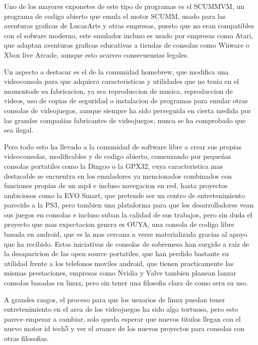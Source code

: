 \begin{multicols}{2}
Uno de los mayores exponetes de este tipo de programas es el SCUMMVM, un programa de codigo abierto que emula el motor SCUMM, usado para las aventuras graficas de LucasArts y otras empresas, puesto que no eran compatibles con el sofware moderno, este emulador incluso es usado por empresas como Atari, que adaptan aventuras graficas educativas a tiendas de consolas como Wiiware o Xbox live Arcade, aunque esto acarreo consecuensias legales.

Un aspecto a destacar es el de la comunidad homebrew, que modifica una videoconsola para que adquiera caracteristicas y utilidades que no tenia en el momentode su fabricacion, ya sea reproduccion de musica, reproduccion de videos, uso de copias de seguridad o instalacion de programas para emular otras consolas de videojuegos, aunque siempre ha sido perseguida en cierta medida por las grandes compańias fabricantes de videojuegos, nunca se ha comprobado que sea ilegal.

Pero todo esto ha llevado a la comunidad de software libre a crear sus propias videoconsolas, modificables y de codigo abierto, comenzando por pequeńas consolas portatiles como la Dingoo o la GPX32, cuya caracteristica mas destacable  se encuentra en los emuladores ya mencionados combinados con funciones propias de un mp4 e incluso navegacion en red, hasta proyectos ambiciosos como la EVO Smart, que pretende ser un centro de entretenimiento parecido a la PS3, pero tambien una plataforma para que los desarrolladores vean sus juegos en consolas e incluso suban la calidad de sus trabajos, pero sin duda el proyecto que mas expectacion genera es OUYA, una consola de codigo libre basada en android, que es la mas cercana a verse materializada gracias al apoyo que ha recibido.
Estas iniciativas de consolas de sobremesa han surgido a raiz de la desaparicion de las open source portatiles, que han perdido bastante su utilidad frente a los telefonos moviles android, que tienen practicamente las mismas prestaciones, empresas como Nvidia y Valve tambien planean lanzar consolas basadas en linux, pero sin tener una filosofia clara de como sera su uso.

A grandes rasgos, el proceso para que los usuarios de linux puedan tener entretenimiento en el area
de los videojuegos ha sido algo tortuoso, pero esto parece empezar a cambiar, solo queda esperar que nuevos
titulos llegan con el nuevo motor id tech5 y  ver el avance de los nuevos proyectos para consolas con otras filosofias.


\end{multicols}
